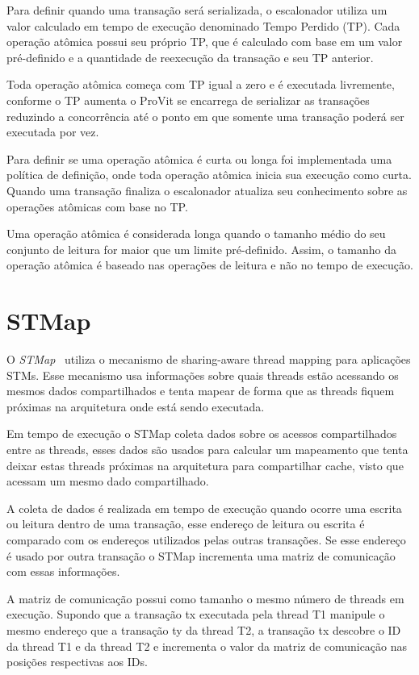 \documentclass[diss,capa]{texufpel}
\begin{document}
Para definir quando uma transação será serializada, o escalonador utiliza um valor calculado em tempo de execução denominado Tempo Perdido (TP). Cada operação atômica possui seu próprio TP, que é calculado com base em um valor pré-definido e a quantidade de reexecução da transação e seu TP anterior.

Toda operação atômica começa com TP igual a zero e é executada livremente, conforme o TP aumenta o ProVit se encarrega de serializar as transações reduzindo a concorrência até o ponto em que somente uma transação poderá ser executada por vez.

Para definir se uma operação atômica é curta ou longa foi implementada uma política de definição, onde toda operação atômica inicia sua execução como curta. Quando uma transação finaliza o escalonador atualiza seu conhecimento sobre as operações atômicas com base no TP.

Uma operação atômica é considerada longa quando o tamanho médio do seu conjunto de leitura for maior que um limite pré-definido. Assim, o tamanho da operação atômica é baseado nas operações de leitura e não no tempo de execução.

\section{STMap}

O \emph{STMap}~\cite{pasqualin2020online} utiliza o mecanismo de sharing-aware thread mapping para aplicações STMs. Esse mecanismo usa informações sobre quais threads estão acessando os mesmos dados compartilhados e tenta mapear de forma que as threads fiquem próximas na arquitetura onde está sendo executada.

Em tempo de execução o STMap coleta dados sobre os acessos compartilhados entre as threads, esses dados são usados para calcular um mapeamento que tenta deixar estas threads próximas na arquitetura para compartilhar cache, visto que acessam um mesmo dado compartilhado.

A coleta de dados é realizada em tempo de execução quando ocorre uma escrita ou leitura dentro de uma transação, esse endereço de leitura ou escrita é comparado com os endereços utilizados pelas outras transações. Se esse endereço é usado por outra transação o STMap incrementa uma matriz de comunicação com essas informações.

A matriz de comunicação possui como tamanho o mesmo número de threads em execução. Supondo que a transação tx executada pela thread T1 manipule o mesmo endereço que a transação ty da thread T2, a transação tx descobre o ID da thread T1 e da thread T2 e incrementa o valor da matriz de comunicação nas posições respectivas aos IDs.
\end{document}
